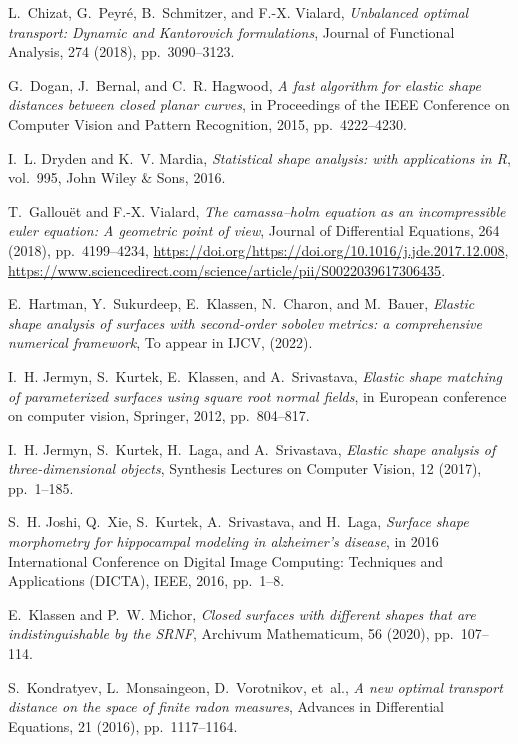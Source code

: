 \documentclass[final,hidelinks,onefignum,onetabnum]{siamart220329}
\begin{document}
\begin{thebibliography}{10}
{\sc L.~Chizat, G.~Peyr{\'e}, B.~Schmitzer, and F.-X. Vialard}, {\em Unbalanced optimal transport: Dynamic and {K}antorovich formulations}, Journal of Functional Analysis, 274 (2018), pp.~3090--3123.

{\sc G.~Dogan, J.~Bernal, and C.~R. Hagwood}, {\em A fast algorithm for elastic shape distances between closed planar curves}, in Proceedings of the IEEE Conference on Computer Vision and Pattern Recognition, 2015, pp.~4222--4230.

{\sc I.~L. Dryden and K.~V. Mardia}, {\em Statistical shape analysis: with applications in R}, vol.~995, John Wiley \& Sons, 2016.

{\sc T.~Gallouët and F.-X. Vialard}, {\em The camassa–holm equation as an incompressible euler equation: A geometric point of view}, Journal of Differential Equations, 264 (2018), pp.~4199--4234, \url{https://doi.org/https://doi.org/10.1016/j.jde.2017.12.008}, \url{https://www.sciencedirect.com/science/article/pii/S0022039617306435}.

{\sc E.~Hartman, Y.~Sukurdeep, E.~Klassen, N.~Charon, and M.~Bauer}, {\em Elastic shape analysis of surfaces with second-order sobolev metrics: a comprehensive numerical framework}, To appear in IJCV,  (2022).

{\sc I.~H. Jermyn, S.~Kurtek, E.~Klassen, and A.~Srivastava}, {\em Elastic shape matching of parameterized surfaces using square root normal fields}, in European conference on computer vision, Springer, 2012, pp.~804--817.

{\sc I.~H. Jermyn, S.~Kurtek, H.~Laga, and A.~Srivastava}, {\em Elastic shape analysis of three-dimensional objects}, Synthesis Lectures on Computer Vision, 12 (2017), pp.~1--185.

{\sc S.~H. Joshi, Q.~Xie, S.~Kurtek, A.~Srivastava, and H.~Laga}, {\em Surface shape morphometry for hippocampal modeling in alzheimer's disease}, in 2016 International Conference on Digital Image Computing: Techniques and Applications (DICTA), IEEE, 2016, pp.~1--8.

{\sc E.~Klassen and P.~W. Michor}, {\em Closed surfaces with different shapes that are indistinguishable by the {SRNF}}, Archivum Mathematicum, 56 (2020), pp.~107--114.

{\sc S.~Kondratyev, L.~Monsaingeon, D.~Vorotnikov, et~al.}, {\em A new optimal transport distance on the space of finite radon measures}, Advances in Differential Equations, 21 (2016), pp.~1117--1164.


\end{thebibliography}
\end{document}
